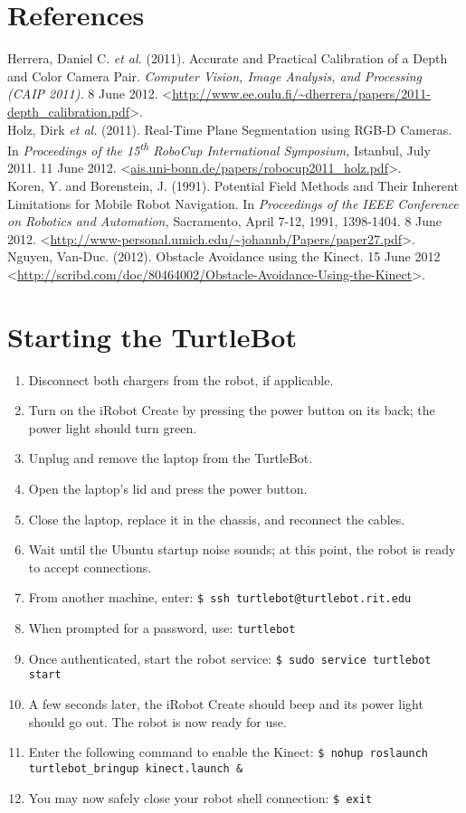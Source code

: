 \documentclass{article}
\begin{document}
\section{References}
Herrera, Daniel C. \textit{et al.} (2011). Accurate and Practical Calibration of a Depth and Color Camera Pair. \textit{Computer Vision, Image Analysis, and Processing (CAIP 2011).} 8 June 2012. <\url{http://www.ee.oulu.fi/~dherrera/papers/2011-depth_calibration.pdf}>.\\
Holz, Dirk \textit{et al.} (2011). Real-Time Plane Segmentation using RGB-D Cameras. In \textit{Proceedings of the 15\textsuperscript{th} RoboCup International Symposium,} Istanbul, July 2011. 11 June 2012. <\url{ais.uni-bonn.de/papers/robocup2011_holz.pdf}>.\\
Koren, Y. and Borenstein, J. (1991). Potential Field Methods and Their Inherent Limitations for Mobile Robot Navigation. In \textit{Proceedings of the IEEE Conference on Robotics and Automation,} Sacramento, April 7-12, 1991, 1398-1404. 8 June 2012. <\url{http://www-personal.umich.edu/~johannb/Papers/paper27.pdf}>.\\
Nguyen, Van-Duc. (2012). Obstacle Avoidance using the Kinect. 15 June 2012 <\url{http://scribd.com/doc/80464002/Obstacle-Avoidance-Using-the-Kinect}>.

\section{Starting the TurtleBot}
\label{sec:start}
\begin{enumerate}
\item{Disconnect both chargers from the robot, if applicable.}
\item{Turn on the iRobot Create by pressing the power button on its back; the power light should turn green.}
\item{Unplug and remove the laptop from the TurtleBot.}
\item{Open the laptop's lid and press the power button.}
\item{Close the laptop, replace it in the chassis, and reconnect the cables.}
\item{Wait until the Ubuntu startup noise sounds; at this point, the robot is ready to accept connections.}
\item{\label{lst:connopen}From another machine, enter: \texttt{\$\ ssh turtlebot@turtlebot.rit.edu}}
\item{\label{lst:connclose}When prompted for a password, use: \texttt{turtlebot}}
\item{Once authenticated, start the robot service: \texttt{\$\ sudo service turtlebot start}}
\item{A few seconds later, the iRobot Create should beep and its power light should go out.  The robot is now ready for use.}
\item{Enter the following command to enable the Kinect: \texttt{\$\ nohup roslaunch turtlebot_bringup kinect.launch &}}
\item{You may now safely close your robot shell connection: \texttt{\$\ exit}}
\end{enumerate}
\end{document}
